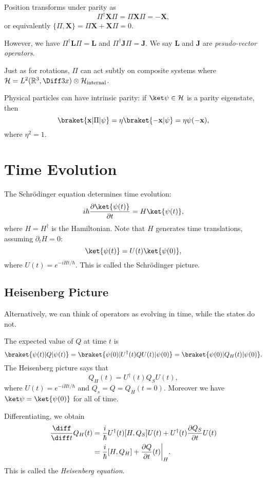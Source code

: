 \documentclass[12pt]{article}
\begin{document}
Position transforms under parity as
\[
\Pi^{\dagger} \mathbf{X} \Pi = \Pi \mathbf{X} \Pi = - \mathbf{X},
\]
or equivalently $\{\Pi, \mathbf{X}\} = \Pi \mathbf{X} + \mathbf{X} \Pi = 0$.

However, we have $\Pi^{\dagger} \mathbf{L} \Pi = \mathbf{L}$ and $\Pi^{\dagger} \mathbf{J} \Pi = \mathbf{J}$. We say $\mathbf{L}$ and $\mathbf{J}$ are \emph{pesudo-vector operators}.

Just as for rotations, $\Pi$ can act subtly on composite systems where $\mathcal{H} = L^2(\mathbb{R}^3, \Diff3x) \otimes \mathcal{H}_{\mathrm{internal}}$.

Physical particles can have intrinsic parity: if $\ket \psi \in \mathcal{H}$ is a parity eigenstate, then
\[
	\braket{\mathbf{x}|\Pi|\psi} = \eta\braket{-\mathbf{x}|\psi} = \eta \psi(-\mathbf{x}),
\]
where $\eta^2 = 1$.


\newpage

\section{Time Evolution}
\label{sec:time_evols}

The Schr\"odinger equation determines time evolution:
\[
	i \hbar \frac{\partial \ket{\psi(t)}}{\partial t} = H \ket{\psi(t)},
\]
where $H = H^{\dagger}$ is the Hamiltonian. Note that $H$ generates time translations, assuming $\partial_t H = 0$:
\[
	\ket{\psi(t)} = U(t) \ket{\psi(0)},
\]
where $U(t) = e^{-iHt/\hbar}$. This is called the Schr\"odinger picture.

\subsection{Heisenberg Picture}
\label{sub:walter_pic}

Alternatively, we can think of operators as evolving in time, while the states do not.

The expected value of $Q$ at time $t$ is
\[
	\braket{\psi(t)|Q|\psi(t)} = \braket{\psi(0)|U^{\dagger}(t)Q U(t)|\psi(0)} = \braket{\psi(0)|Q_H(t)|\psi(0)}.
\]
The Heisenberg picture says that
\[
Q_H(t) = U^{\dagger}(t) Q_S U(t),
\]
where $U(t) = e^{-iHt/\hbar}$ and $Q_s = Q = Q_H(t = 0)$. Moreover we have $\ket \psi = \ket{\psi(0)}$ for all of time.

Differentiating, we obtain
\begin{align*}
	\frac{\diff}{\diff t}Q_H(t) &= \frac{i}{\hbar}U^{\dagger}(t)[H, Q_S] U(t) + U^{\dagger}(t) \frac{\partial Q_S}{\partial t} U(t) \\
				    &= \frac{i}{\hbar} [H,Q_H] + \frac{\partial Q}{\partial t}(t) \biggr|_H.
\end{align*}
This is called the \emph{Heisenberg equation}.
\end{document}
